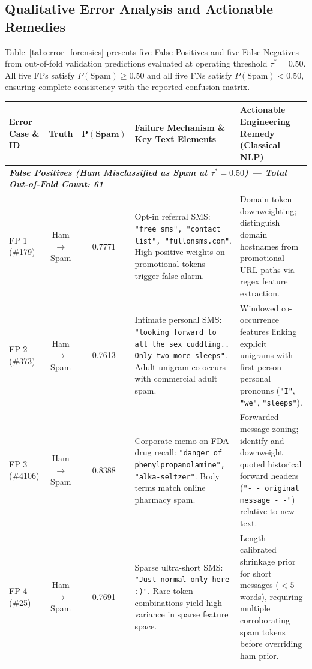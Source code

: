 \documentclass[10pt,onecolumn,letterpaper]{article}
\begin{document}
\subsection{Qualitative Error Analysis and Actionable Remedies}
Table~\ref{tab:error_forensics} presents five False Positives and five False Negatives from out-of-fold validation predictions evaluated at operating threshold $\tau^*=0.50$. All five FPs satisfy $P(\text{Spam}) \ge 0.50$ and all five FNs satisfy $P(\text{Spam}) < 0.50$, ensuring complete consistency with the reported confusion matrix.

\begin{table}[htbp]
\centering
\scriptsize
\setlength{\tabcolsep}{3.5pt}
\renewcommand{\arraystretch}{1.12}
\begin{tabularx}{\textwidth}{l c c X X}
\toprule
\textbf{Error Case \& ID} & \textbf{Truth} & $\bm{P(\text{Spam})}$ & \textbf{Failure Mechanism \& Key Text Elements} & \textbf{Actionable Engineering Remedy (Classical NLP)} \\
\midrule
\multicolumn{5}{l}{\textit{\textbf{False Positives (Ham Misclassified as Spam at $\tau^*=0.50$) --- Total Out-of-Fold Count: 61}}} \\
FP 1 (\#179) & Ham $\to$ Spam & 0.7771 & Opt-in referral SMS: \texttt{"free sms", "contact list", "fullonsms.com"}. High positive weights on promotional tokens trigger false alarm. & Domain token downweighting; distinguish domain hostnames from promotional URL paths via regex feature extraction. \\
FP 2 (\#373) & Ham $\to$ Spam & 0.7613 & Intimate personal SMS: \texttt{"looking forward to all the sex cuddling.. Only two more sleeps"}. Adult unigram co-occurs with commercial adult spam. & Windowed co-occurrence features linking explicit unigrams with first-person personal pronouns (\texttt{"I"}, \texttt{"we"}, \texttt{"sleeps"}). \\
FP 3 (\#4106) & Ham $\to$ Spam & 0.8388 & Corporate memo on FDA drug recall: \texttt{"danger of phenylpropanolamine", "alka-seltzer"}. Body terms match online pharmacy spam. & Forwarded message zoning; identify and downweight quoted historical forward headers (\texttt{"- - original message - -"}) relative to new text. \\
FP 4 (\#25) & Ham $\to$ Spam & 0.7691 & Sparse ultra-short SMS: \texttt{"Just normal only here :)"}. Rare token combinations yield high variance in sparse feature space. & Length-calibrated shrinkage prior for short messages ($<5$ words), requiring multiple corroborating spam tokens before overriding ham prior. \\

\end{tabularx}
\end{table}
\end{document}
